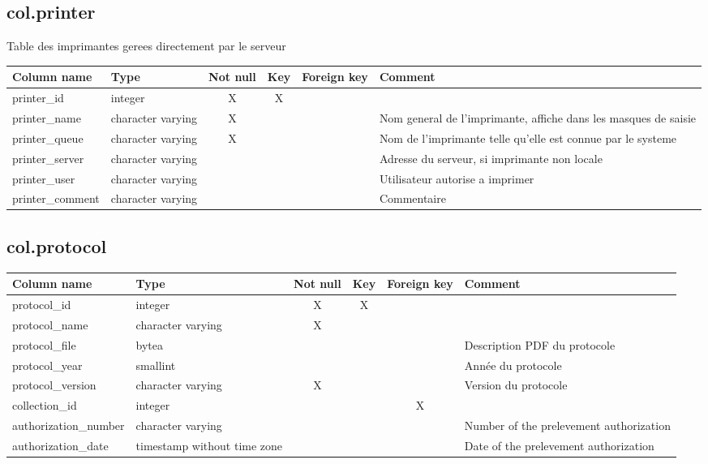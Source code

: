 \subsection{col.printer}
Table des imprimantes gerees directement par le serveur

\begin{tabular}{|l| p{2cm}|c|c|c| p{3cm}|}
\hline
Column name & Type & Not null & Key & Foreign key & Comment \\
\hline
printer\_id & integer & X & X & & \\
\hline
printer\_name & character varying & X & & & Nom general de l'imprimante, affiche dans les masques de saisie\\
\hline
printer\_queue & character varying & X & & & Nom de l'imprimante telle qu'elle est connue par le systeme\\
\hline
printer\_server & character varying & & & & Adresse du serveur, si imprimante non locale\\
\hline
printer\_user & character varying & & & & Utilisateur autorise a imprimer \\
\hline
printer\_comment & character varying & & & & Commentaire\\
\hline
\end{tabular}
\subsection{col.protocol}


\begin{tabular}{|l| p{2cm}|c|c|c| p{3cm}|}
\hline
Column name & Type & Not null & Key & Foreign key & Comment \\
\hline
protocol\_id & integer & X & X & & \\
\hline
protocol\_name & character varying & X & & & \\
\hline
protocol\_file & bytea & & & & Description PDF du protocole\\
\hline
protocol\_year & smallint & & & & Année du protocole\\
\hline
protocol\_version & character varying & X & & & Version du protocole\\
\hline
collection\_id & integer & & & X & \\
\hline
authorization\_number & character varying & & & & Number of the prelevement authorization\\
\hline
authorization\_date & timestamp without time zone & & & & Date of the prelevement authorization\\
\hline
\end{tabular}
